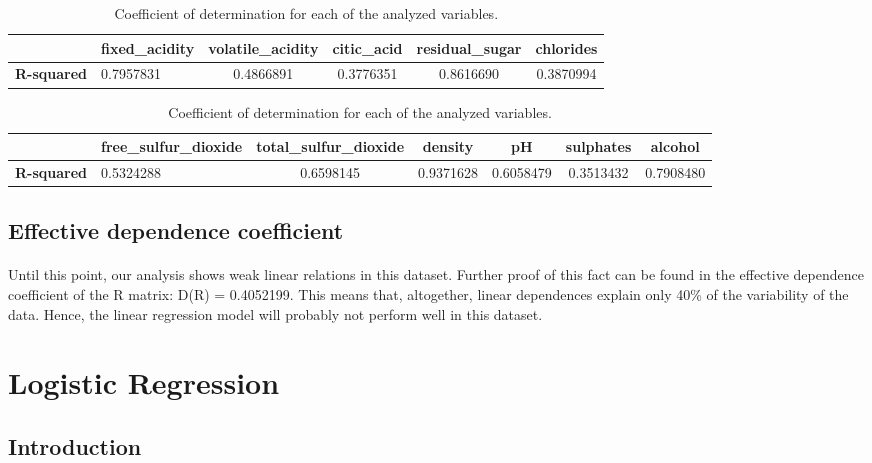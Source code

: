 \documentclass[10pt]{article}
\begin{document}
\begin{table}[h]
	\centering
		\begin{tabular}{@{}llcccc@{}}
			\toprule
			\textbf{} & \textbf{fixed\_acidity} & \textbf{volatile\_acidity} & \textbf{citic\_acid} & \textbf{residual\_sugar} & \textbf{chlorides}  \\ \midrule
			\textbf{R-squared} & 0.7957831 & 0.4866891 & 0.3776351 & 0.8616690 & 0.3870994  \\ \bottomrule
		\end{tabular}

	\vspace{0.5cm}

	\centering
		\begin{tabular}{@{}llccccc@{}}
			\toprule
			\textbf{} & \textbf{free\_sulfur\_dioxide} & \textbf{total\_sulfur\_dioxide} & \textbf{density} & \textbf{pH} & \textbf{sulphates} & \textbf{alcohol} \\ \midrule
			\textbf{R-squared} &  0.5324288 &0.6598145 & 0.9371628 & 0.6058479 & 0.3513432 & 0.7908480 \\ \bottomrule
		\end{tabular}
	\caption{Coefficient of determination for each of the analyzed variables.}
	\label{table:determination}
\end{table}

\subsection{Effective dependence coefficient}
\paragraph*{}

Until this point, our analysis shows weak linear relations in this dataset. Further proof of this fact can be found in the effective dependence coefficient of the R matrix: D(R) = 0.4052199. This means that, altogether, linear dependences explain only 40\% of the variability of the data. Hence, the linear regression model will probably not perform well in this dataset.


\section{Logistic Regression}

\subsection{Introduction}
\end{document}
